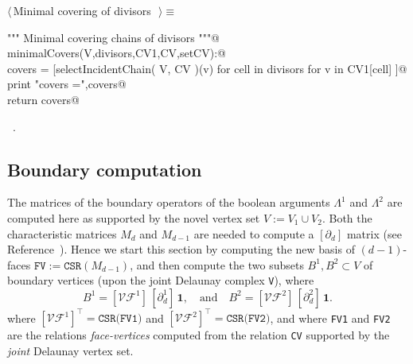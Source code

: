 \documentclass[11pt,oneside]{article}	%
\begin{document}
\begin{flushleft} \small \label{scrap14}
$\langle\,$Minimal covering of divisors\nobreak\ {\footnotesize {}}$\,\rangle\equiv$
\vspace{-1ex}
\begin{list}{}{} \item
\mbox{}\verb@""" Minimal covering chains of divisors """@\\
\mbox{}\verb@def minimalCovers(V,divisors,CV1,CV,setCV):@\\
\mbox{}\verb@   covers = [selectIncidentChain( V, CV )(v) for cell in divisors for v in CV1[cell] ]@\\
\mbox{}\verb@   print "\n covers =",covers@\\
\mbox{}\verb@   return covers@\\
\mbox{}\verb@@{\NWsep}
\end{list}
\vspace{-1ex}
\footnotesize\addtolength{\baselineskip}{-1ex}
\begin{list}{}{\setlength{\itemsep}{-\parsep}\setlength{\itemindent}{-\leftmargin}}
\item \NWtxtMacroRefIn\ .
\end{list}
\end{flushleft}




\subsection{Boundary computation}
The matrices of the boundary operators of the boolean arguments $\Lambda^1$ and $\Lambda^2$ are computed here as supported by the novel vertex set $V := V_1 \cup V_2$. Both the characteristic matrices $M_d$ and $M_{d-1}$ are needed to compute a $[\partial_d]$ matrix (see Reference~\cite{Dicarlo:2014:TNL:2543138.2543294}). Hence we start this section by computing the new basis of $(d-1)$-faces $\texttt{FV} := \texttt{CSR}(M_{d-1})$, and then compute the two subsets $B^1,B^2 \subset V$ of boundary vertices (upon the joint Delaunay complex \texttt{V}), where
\[
B^1 = [\mathcal{VF}^1]\, [\partial_d^1]\,\mathbf{1},
\quad\mbox{and}\quad
B^2 = [\mathcal{VF}^2]\, [\partial_d^2]\,\mathbf{1}.
\]
where $[\mathcal{VF}^1]^\top = \texttt{CSR(FV1)}$ and $[\mathcal{VF}^2]^\top = \texttt{CSR(FV2)}$,
and where \texttt{FV1} and \texttt{FV2} are the relations \emph{face-vertices} computed from the relation \texttt{CV} supported by the \emph{joint} Delaunay vertex set. 
\end{document}
